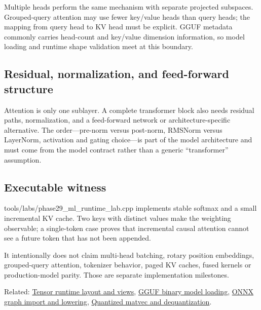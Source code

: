 Multiple heads perform the same mechanism with separate projected subspaces. Grouped-query attention may use fewer key/value heads than query heads; the mapping from query head to KV head must be explicit. GGUF metadata commonly carries head-count and key/value dimension information, so model loading and runtime shape validation meet at this boundary.

\subsection{Residual, normalization, and feed-forward structure}\label{appendix-ea2dadd21ce5-residual-normalization-and-feed-forward-structure}

Attention is only one sublayer. A complete transformer block also needs residual paths, normalization, and a feed-forward network or architecture-specific alternative. The order---pre-norm versus post-norm, RMSNorm versus LayerNorm, activation and gating choice---is part of the model architecture and must come from the model contract rather than a generic ``transformer'' assumption.

\subsection{Executable witness}\label{appendix-ea2dadd21ce5-executable-witness}

tools/labs/phase29\_ml\_runtime\_lab.cpp implements stable softmax and a small incremental KV cache. Two keys with distinct values make the weighting observable; a single-token case proves that incremental causal attention cannot see a future token that has not been appended.

It intentionally does not claim multi-head batching, rotary position embeddings, grouped-query attention, tokenizer behavior, paged KV caches, fused kernels or production-model parity. Those are separate implementation milestones.

Related: \hyperref[appendix-cebadf3106d1]{Tensor runtime layout and views}, \hyperref[appendix-fef72dd246f2]{GGUF binary model loading}, \hyperref[appendix-a87217e3af2b]{ONNX graph import and lowering}, \hyperref[appendix-241c0e42ac2d]{Quantized matvec and dequantization}.
